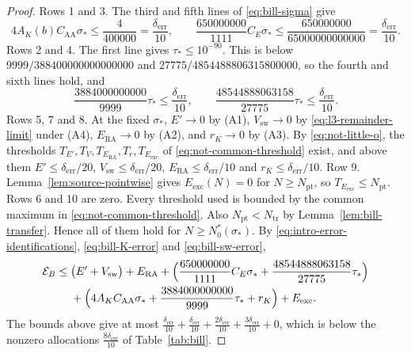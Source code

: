 \begin{proof}
Rows 1 and 3. The third and fifth lines of \eqref{eq:bill-sigma} give
\[
 4A_K(b)C_{\mathrm{AA}}\sigma_*\le\frac4{400000}=\frac{\delta_{\mathrm{err}}}{10},
 \qquad
 \frac{650000000}{1111}C_E\sigma_*\le\frac{650000000}{65000000000000}
 =\frac{\delta_{\mathrm{err}}}{10}.
\]
Rows 2 and 4. The first line gives $\tau_*\le10^{-90}$. This is below
$9999/388400000000000000$ and $27775/4854488806315800000$, so the fourth and
sixth lines hold, and
\[
 \frac{3884000000000}{9999}\tau_*\le\frac{\delta_{\mathrm{err}}}{10},\qquad
 \frac{48544888063158}{27775}\tau_*\le\frac{\delta_{\mathrm{err}}}{10}.
\]
Rows 5, 7 and 8. At the fixed $\sigma_*$, $E'\to0$ by \textup{(A1)},
$V_{\mathrm{sw}}\to0$ by \eqref{eq:l3-remainder-limit} under \textup{(A4)},
$E_{\mathrm{RA}}\to0$ by \textup{(A2)}, and $r_K\to0$ by \textup{(A3)}.
By \eqref{eq:not-little-o}, the thresholds
$T_{E'},T_V,T_{E_{\mathrm{RA}}},T_r,T_{E_{\mathrm{exc}}}$ of
\eqref{eq:not-common-threshold} exist,
and above them $E'\le\delta_{\mathrm{err}}/20$,
$V_{\mathrm{sw}}\le\delta_{\mathrm{err}}/20$,
$E_{\mathrm{RA}}\le\delta_{\mathrm{err}}/10$ and
$r_K\le\delta_{\mathrm{err}}/10$.
Row 9. Lemma~\ref{lem:source-pointwise} gives $E_{\mathrm{exc}}(N)=0$ for
$N\ge N_{\mathrm{pt}}$, so $T_{E_{\mathrm{exc}}}\le N_{\mathrm{pt}}$.
Rows 6 and 10 are zero.
Every threshold used is bounded by the common maximum in
\eqref{eq:not-common-threshold}. Also $N_{\mathrm{pt}}<N_{\mathrm{tr}}$
by Lemma~\ref{lem:bill-transfer}. Hence all of them hold for
$N\ge N_0^*(\sigma_*)$. By \eqref{eq:intro-error-identifications},
\eqref{eq:bill-K-error} and \eqref{eq:bill-sw-error},
\[
\begin{aligned}
 \mathcal E_B
 \le{}&\bigl(E'+V_{\mathrm{sw}}\bigr)+E_{\mathrm{RA}}
   +\Bigl(\frac{650000000}{1111}C_E\sigma_*+\frac{48544888063158}{27775}\tau_*\Bigr)\\
   &+\Bigl(4A_KC_{\mathrm{AA}}\sigma_*+\frac{3884000000000}{9999}\tau_*+r_K\Bigr)
   +E_{\mathrm{exc}}.
\end{aligned}
\]
The bounds above give at most
$\frac{\delta_{\mathrm{err}}}{10}+\frac{\delta_{\mathrm{err}}}{10}
+\frac{2\delta_{\mathrm{err}}}{10}+\frac{3\delta_{\mathrm{err}}}{10}+0$,
which is below the nonzero allocations
$\frac{8\delta_{\mathrm{err}}}{10}$ of Table~\ref{tab:bill}.
\end{proof}

